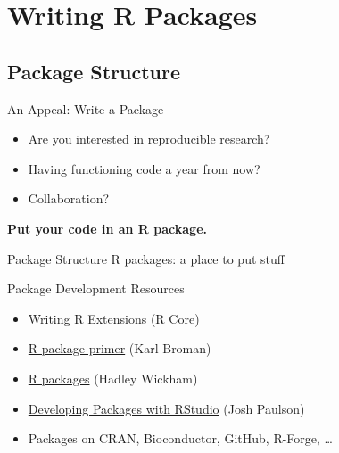 \section{Writing R Packages}
\makesubcontentsslides



\subsection{Package Structure}
\makesubcontentsslidessec

\begin{frame}
  \begin{block}{An Appeal:  Write a Package}
    \begin{itemize}
      \item Are you interested in reproducible research?
      \item Having functioning code a year from now?
      \item Collaboration?
    \end{itemize}
    \begin{center}
    \vspace{.2cm}
      \textbf{Put your code in an R package.}
    \end{center}
  \end{block}
\end{frame}


\begin{frame}[fragile]
  \begin{block}{Package Structure}
  R packages: a place to put stuff\\
  \end{block}
\end{frame}

\begin{frame}
  \begin{block}{Package Development Resources}
    \begin{itemize}
      \item \href{http://cran.r-project.org/doc/manuals/R-exts.html}{Writing R 
Extensions} (R Core)
      \item \href{http://kbroman.org/pkg_primer/}{R package primer} (Karl 
Broman)
      \item \href{http://r-pkgs.had.co.nz/}{R packages} (Hadley Wickham)
      \item 
\href{
https://support.rstudio.com/hc/en-us/articles/200486488-Developing-Packages-with
-RStudio}{Developing Packages with RStudio} (Josh Paulson)
      \item Packages on CRAN, Bioconductor, GitHub, R-Forge, \dots
    \end{itemize}
  \end{block}
\end{frame}


